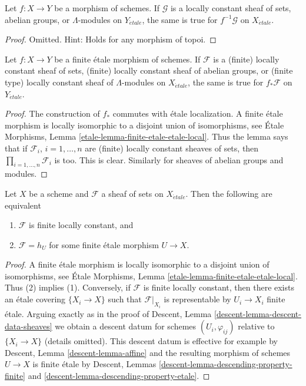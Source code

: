 \begin{lemma}
\label{lemma-pullback-locally-constant}
Let $f : X \to Y$ be a morphism of schemes. If $\mathcal{G}$ is a
locally constant sheaf of sets, abelian groups, or $\Lambda$-modules
on $Y_{\acute{e}tale}$, the same is true for $f^{-1}\mathcal{G}$
on $X_{\acute{e}tale}$.
\end{lemma}

\begin{proof}
Omitted. Hint: Holds for any morphism of topoi.
\end{proof}

\begin{lemma}
\label{lemma-pushforward-locally-constant}
Let $f : X \to Y$ be a finite \'etale morphism of schemes.
If $\mathcal{F}$ is a (finite) locally constant sheaf of sets,
(finite) locally constant sheaf of abelian groups, or
(finite type) locally constant sheaf of $\Lambda$-modules
on $X_{\acute{e}tale}$, the same is true for $f_*\mathcal{F}$
on $Y_{\acute{e}tale}$.
\end{lemma}

\begin{proof}
The construction of $f_*$ commutes with \'etale localization.
A finite \'etale morphism is locally isomorphic to a disjoint union
of isomorphisms, see
\'Etale Morphisms, Lemma \ref{etale-lemma-finite-etale-etale-local}.
Thus the lemma says that if $\mathcal{F}_i$, $i = 1, \ldots, n$
are (finite) locally constant sheaves of sets, then
$\prod_{i = 1, \ldots, n} \mathcal{F}_i$ is too.
This is clear. Similarly for sheaves of abelian groups and modules.
\end{proof}

\begin{lemma}
\label{lemma-characterize-finite-locally-constant}
Let $X$ be a scheme and $\mathcal{F}$ a sheaf of sets on $X_{\acute{e}tale}$.
Then the following are equivalent
\begin{enumerate}
\item $\mathcal{F}$ is finite locally constant, and
\item $\mathcal{F} = h_U$ for some finite \'etale morphism $U \to X$.
\end{enumerate}
\end{lemma}

\begin{proof}
A finite \'etale morphism is locally isomorphic to a disjoint union
of isomorphisms, see
\'Etale Morphisms, Lemma \ref{etale-lemma-finite-etale-etale-local}.
Thus (2) implies (1). Conversely, if $\mathcal{F}$ is finite locally
constant, then there exists an \'etale covering $\{X_i \to X\}$ such that
$\mathcal{F}|_{X_i}$ is representable by $U_i \to X_i$ finite \'etale.
Arguing exactly as in the proof of
Descent, Lemma \ref{descent-lemma-descent-data-sheaves}
we obtain a descent datum for schemes $(U_i, \varphi_{ij})$ relative to
$\{X_i \to X\}$ (details omitted). This descent datum is effective for
example by Descent, Lemma \ref{descent-lemma-affine}
and the resulting morphism of schemes $U \to X$ is finite \'etale
by Descent, Lemmas \ref{descent-lemma-descending-property-finite} and
\ref{descent-lemma-descending-property-etale}.
\end{proof}

